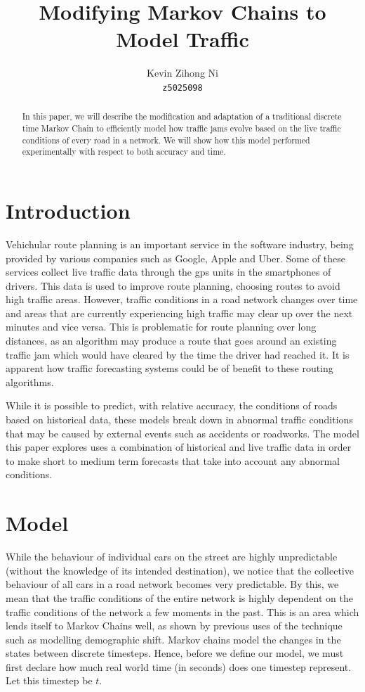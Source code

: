 \documentclass[a4paper]{article}
\title{Modifying Markov Chains to Model Traffic}
\author{Kevin Zihong Ni\\\texttt{z5025098}}
\begin{document}
\maketitle

\begin{abstract}
	In this paper, we will describe the modification and adaptation of a traditional discrete time Markov Chain to efficiently model how 
	traffic jams evolve based on the live traffic conditions of every road in a network.
	We will show how this model performed experimentally with respect to both accuracy and time.
\end{abstract}

\section{Introduction}
Vehichular route planning is an important service in the software industry, being provided by various companies such as Google, Apple and Uber.
Some of these services collect live traffic data through the gps units in the smartphones of drivers.
This data is used to improve route planning, choosing routes to avoid high traffic areas.
However, traffic conditions in a road network changes over time and areas that are currently experiencing high traffic may clear up over the next minutes and vice versa.
This is problematic for route planning over long distances, 
as an algorithm may produce a route that goes around an existing traffic jam which would have cleared by the time the driver had reached it.  
It is apparent how traffic forecasting systems could be of benefit to these routing algorithms.

While it is possible to predict, with relative accuracy, the conditions of roads based on historical data, 
these models break down in abnormal traffic conditions that may be caused by external events such as accidents or roadworks.
The model this paper explores uses a combination of historical and live traffic data in order to make short to medium term forecasts that take into account any 
abnormal conditions. 

\section{Model}
While the behaviour of individual cars on the street are highly unpredictable (without the knowledge of its intended destination), we notice that the collective behaviour 
of all cars in a road network becomes very predictable.
By this, we mean that the traffic conditions of the entire network is highly dependent on the traffic conditions of the network a few moments in the past.
This is an area which lends itself to Markov Chains well, as shown by previous uses of the technique such as modelling demographic shift.
Markov chains model the changes in the states between discrete timesteps. 
Hence, before we define our model, we must first declare how much real world time (in seconds) does one timestep represent. 
Let this timestep be $t$.
\end{document}
